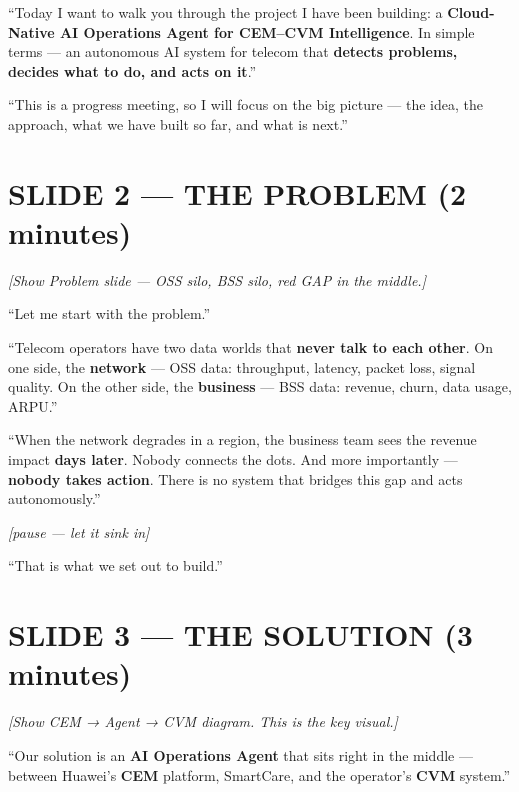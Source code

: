 \documentclass[12pt,a4paper]{article}
\newcommand{\stage}[1]{\par\textit{\color{stagedir}[#1]}\par}
\newcommand{\beat}{\par\vspace{0.4em}}
\newcommand{\pause}{\par\textit{\color{stagedir}[pause --- let it sink
            in]}\par}
\newcommand{\keyword}[1]{\textbf{\color{aiviolet}#1}}
\newcommand{\emphasis}[1]{\textbf{\color{huaweired}#1}}
\begin{document}
\beat

``Today I want to walk you through the project I have been building: a
\keyword{Cloud-Native AI Operations Agent for CEM--CVM Intelligence}. In simple
terms --- an autonomous AI system for telecom that \emphasis{detects problems,
    decides what to do, and acts on it}.''

\beat

``This is a progress meeting, so I will focus on the big picture --- the idea,
the approach, what we have built so far, and what is next.''

\newpage
\section{SLIDE 2 --- THE PROBLEM (2 minutes)}

\stage{Show Problem slide --- OSS silo, BSS silo, red GAP in the middle.}

``Let me start with the problem.''

\beat

``Telecom operators have two data worlds that \emphasis{never talk to each
    other}. On one side, the \keyword{network} --- OSS data: throughput, latency,
packet loss, signal quality. On the other side, the \keyword{business} --- BSS
data: revenue, churn, data usage, ARPU.''

\beat

``When the network degrades in a region, the business team sees the revenue
impact \emphasis{days later}. Nobody connects the dots. And more importantly
--- \emphasis{nobody takes action}. There is no system that bridges this gap
and acts autonomously.''

\pause

``That is what we set out to build.''

\newpage
\section{SLIDE 3 --- THE SOLUTION (3 minutes)}

\stage{Show CEM → Agent → CVM diagram. This is the key visual.}

``Our solution is an \keyword{AI Operations Agent} that sits right in the
middle --- between Huawei's \keyword{CEM} platform, SmartCare, and the
operator's \keyword{CVM} system.''
\end{document}
